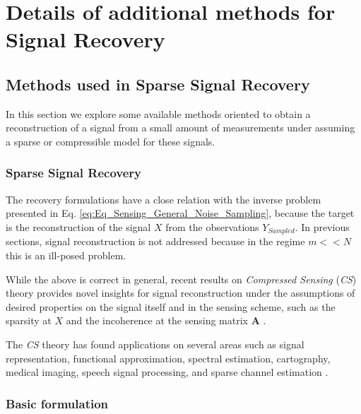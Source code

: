 \section{Details of additional methods for Signal Recovery}
\label{sec_app_GLOBALSPARSESR}

\subsection{Methods used in Sparse Signal Recovery}
\label{secSecRecIntro}

In this section we explore some available methods oriented to obtain a reconstruction of a signal from a small amount of measurements under assuming a sparse or compressible model for these signals.

\subsubsection{Sparse Signal Recovery}

The recovery formulations have a close relation with the inverse problem presented in Eq. \eqref{eq:Eq_Sensing_General_Noise_Sampling}, because the target is the reconstruction of the signal $X$ from the observations $Y_{Sampled}$. In previous sections, signal reconstruction is not addressed because in the regime $m << N$ this is an ill-posed problem. 

While the above is correct in general, recent results on \emph{Compressed Sensing} (\emph{CS}) theory provides novel insights for signal reconstruction under the assumptions of desired properties on the signal itself and in the sensing scheme, such as the sparsity at $X$ and the incoherence at the sensing matrix \textbf{A} \citep{Candes_2006_a,Eldar_2012_a}. 

The \emph{CS} theory has found applications on several areas such as signal representation, functional approximation, spectral estimation, cartography, medical imaging, speech signal processing, and sparse channel estimation \citep{Eldar_2012_a,Elad_2010_a,Starck_2010_a}. 


\subsubsection{Basic formulation}
\label{subSecBasicCSFor}

